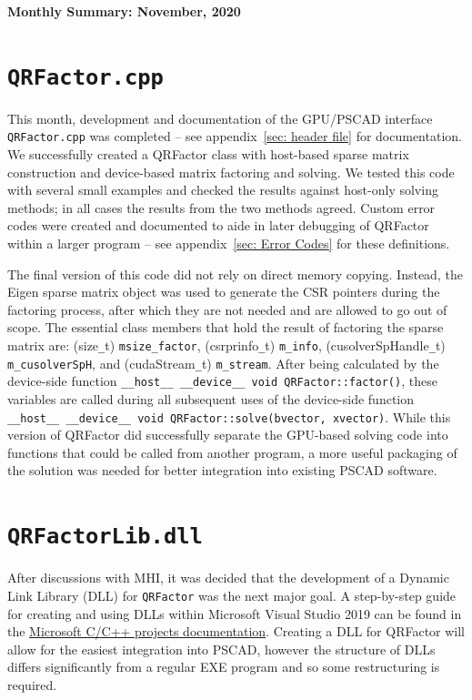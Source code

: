 \documentclass[11pt,letterpaper]{article}
\newcommand{\qrf}{\texttt{QRFactor}}
\begin{document}
\begin{center}
    {\Large \bf Monthly Summary: November, 2020}
\end{center}

\section*{\texttt{QRFactor.cpp}}

This month, development and documentation of the GPU/PSCAD interface \verb+QRFactor.cpp+ was completed -- see appendix~\ref{sec: header file} for documentation. We successfully created a QRFactor class with host-based sparse matrix construction and device-based matrix factoring and solving. We tested this code with several small examples and checked the results against host-only solving methods; in all cases the results from the two methods agreed. Custom error codes were created and documented to aide in later debugging of QRFactor within a larger program -- see appendix~\ref{sec: Error Codes} for these definitions.

The final version of this code did not rely on direct memory copying. Instead, the Eigen sparse matrix object was used to generate the CSR pointers during the factoring process, after which they are not needed and are allowed to go out of scope. The essential class members that hold the result of factoring the sparse matrix are: (size\verb+_+t) \verb+msize_factor+, (csrprinfo\verb+_+t) \verb+m_info+, (cusolverSpHandle\verb+_+t) \verb+m_cusolverSpH+, and (cudaStream\verb+_+t) \verb+m_stream+. After being calculated by the device-side function \verb+__host__ __device__ void QRFactor::factor()+, these variables are called during all subsequent uses of the device-side function \verb+__host__ __device__ void QRFactor::solve(bvector, xvector)+. While this version of QRFactor did successfully separate the GPU-based solving code into functions that could be called from another program, a more useful packaging of the solution was needed for better integration into existing PSCAD software.

\section*{\texttt{QRFactorLib.dll}}

After discussions with MHI, it was decided that the development of a Dynamic Link Library (DLL) for \qrf\! was the next major goal. A step-by-step guide for creating and using DLLs within Microsoft Visual Studio 2019 can be found in the \href{https://docs.microsoft.com/en-us/cpp/build/walkthrough-creating-and-using-a-dynamic-link-library-cpp?view=msvc-160#see-also}{Microsoft C/C++ projects documentation}. Creating a DLL for QRFactor will allow for the easiest integration into PSCAD, however the structure of DLLs differs significantly from a regular EXE program and so some restructuring is required. 
\end{document}
